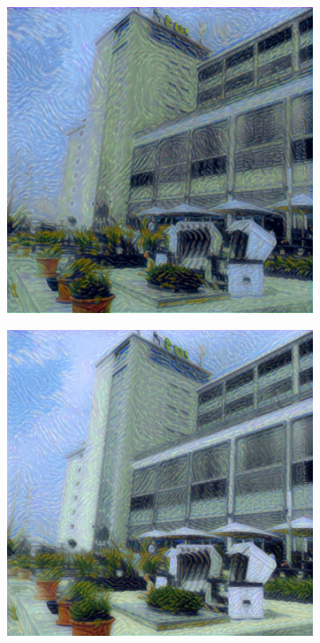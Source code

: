\begin{figure}[H]
\begin{subfigure}[h]{0.15\textwidth}
    \end{subfigure}
    \begin{subfigure}[h]{0.15\textwidth}
        \centering
        \includegraphics[width=\textwidth]{resources/content/experiments/b__starry_night__768x768__style-weight_1e+08__tv-weight_1e-05.jpg}
    \end{subfigure}
    \begin{subfigure}[h]{0.15\textwidth}
        \centering
        \includegraphics[width=\textwidth]{resources/content/experiments/b__starry_night__768x768__style-weight_1e+08__tv-weight_1e-04.jpg}

\end{subfigure}
\end{figure}
